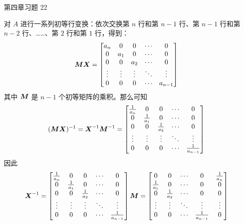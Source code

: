 \begin{problem}
	第四章习题 22

	\begin{solution}
		对 $A$ 进行一系列初等行变换：依次交换第 $n$ 行和第 $n-1$ 行、第 $n-1$ 行和第 $n-2$ 行、……、第 $2$ 行和第 $1$ 行，得到：
		$$
		\boldsymbol{M} \boldsymbol{X} = \begin{bmatrix}
			a_n & 0 & 0 & \cdots & 0 \\
			0 & a_1 & 0 & \cdots & 0 \\
			0 & 0 & a_2 & \cdots & 0 \\
			\vdots & \vdots & \vdots & \ddots & \vdots \\
			0 & 0 & 0 & \cdots & a_{n-1}
		\end{bmatrix}
		$$
		其中 $\boldsymbol{M}$ 是 $n-1$ 个初等矩阵的乘积。那么可知
		$$
		(\boldsymbol{M} \boldsymbol{X})^{-1} = \boldsymbol{X}^{-1} \boldsymbol{M}^{-1} = \begin{bmatrix}
			\frac{1}{a_n} & 0 & 0 & \cdots & 0 \\
			0 & \frac{1}{a_1} & 0 & \cdots & 0 \\
			0 & 0 & \frac{1}{a_2} & \cdots & 0 \\
			\vdots & \vdots & \vdots & \ddots & \vdots \\
			0 & 0 & 0 & \cdots & \frac{1}{a_{n-1}}
		\end{bmatrix}
		$$
		因此
		$$
		\boldsymbol{X}^{-1} = \begin{bmatrix}
			\frac{1}{a_n} & 0 & 0 & \cdots & 0 \\
			0 & \frac{1}{a_1} & 0 & \cdots & 0 \\
			0 & 0 & \frac{1}{a_2} & \cdots & 0 \\
			\vdots & \vdots & \vdots & \ddots & \vdots \\
			0 & 0 & 0 & \cdots & \frac{1}{a_{n-1}}
		\end{bmatrix} \boldsymbol{M} = \begin{bmatrix}
			0 & 0 & \cdots & 0 & \frac{1}{a_n} \\
			\frac{1}{a_1} & 0 & \cdots & 0 & 0 \\
			0 & \frac{1}{a_2} & \cdots & 0 & 0 \\
			\vdots & \vdots & \ddots & \vdots & \vdots \\
			0 & 0 & \cdots & \frac{1}{a_{n-1}} & 0
		\end{bmatrix}
		$$
	\end{solution}
\end{problem}

